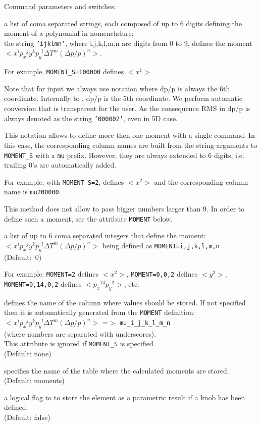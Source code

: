 Command parameters and switches:
\begin{madlist}
   a list of coma separated strings, each composed of
  up to 6 digits defining the moment of a polynomial in \ptc
  nomenclature: \\ the string \texttt{'ijklmn'}, where i,j,k,l,m,n are digits
  from 0 to 9, defines the moment $<x^i {p_x}^j y^k {p_y}^l \Delta T^m
  (\Delta p/p)^n>$.

  For example, \texttt{MOMENT\_S=100000} defines $<x^1>$

  Note that for input we always use \madx notation where dp/p is always
  the 6th coordinate. Internally to \ptc, dp/p is the 5th coordinate. We
  perform automatic conversion that is transparent for the user. As the
  consequence RMS in dp/p is always denoted as the string
  \texttt{'000002'}, even in 5D case.

  This notation allows to define more then one moment with a single
  command. In this case, the corresponding column names are built from
  the string arguments to \texttt{MOMENT\_S} with a \texttt{mu} prefix.
  However, they are always extended to 6 digits, i.e. trailing 0's are
  automatically added.

  For example, with \texttt{MOMENT\_S=2}, defines  $<x^2>$ and the
  corresponding column name is \texttt{mu200000}.

  This method does not allow to pass bigger numbers larger than 9. In
  order to define such a moment, see the attribute \texttt{MOMENT} below.

   a list of up to 6 coma separated integers that define
  the moment: \\
  $<x^i {p_x}^j y^k {p_y}^l \Delta T^m (\Delta p/p)^n>$ being
  defined as \texttt{MOMENT=i,j,k,l,m,n}\\
  (Default:~0)

  For example: \texttt{MOMENT=2} defines $< x^2 >$, \texttt{MOMENT=0,0,2}
  defines  $< y^2 >$, \texttt{MOMENT=0,14,0,2} defines $<{p_x}^{14} {p_y}^2>$,
  etc.

   defines the name of the column where values should be
  stored. If not specified then it is automatically generated from
  the \texttt{MOMENT} definition:\\
  $< x^i {p_x}^j y^k {p_y}^l \Delta T^m (\Delta p/p)^n>$ =$>$ \texttt{mu\_i\_j\_k\_l\_m\_n} \\
  (where numbers are separated with underscores). \\
  This attribute is ignored if \texttt{MOMENT\_S} is specified. \\
  (Default: none)

   specifies the name of the table where the calculated
  moments are stored. \\
  (Default: moments)

   a logical flag to to store the element as a
  parametric result if a \hyperref[sec:ptc-knob]{knob} has been
  defined. \\
  (Default: false)
\end{madlist}

